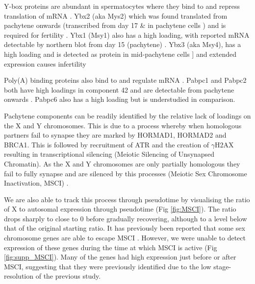 Y-box proteins are abundant in spermatocytes where they bind to and repress translation of mRNA \parencite[Reviwed in]{Kleene2016Positiondependent}. Ybx2 (aka Mys2) which was found translated from pachytene onwards \parencite{Kwon1993Proteins, Oko1996Germ} (transcribed from day 17 \& in pachytene cells \parencite{Gu1998Mammalian}) and is required for fertility \parencite{Yang2005Absence}. Ybx1 (Msy1) also has a high loading, with reported mRNA detectable by northern blot from day 15 (pachytene) \parencite{Tafuri1993mouse}. Ybx3 (aka Msy4), has a high loading and is detected as protein in mid-pachytene cells \parencite{Davies2000SequenceSpecific}] and extended expression causes infertility \parencite{Giorgini2002Translational}

Poly(A) binding proteins also bind to and regulate mRNA \parencite[reviewed in]{OZTURK2018Potential}. Pabpc1 and Pabpc2 both have high loadings in component 42 and are detectable from pachytene onwards \parencite{C.Kleene1994Developmental, Gu1995Poly, Kleene1998Mouse, Lee2000Expression, Kimura2009Characterization}. Pabpc6 also has a high loading but is understudied in comparison.

Pachytene components can be readily identified by the relative lack of loadings on the X and Y chromosomes. This is due to a process whereby when homologous partners fail to synapse they are marked by HORMAD1, HORMAD2 and BRCA1. This is followed by recruitment of ATR and the creation of $\gamma$H2AX resulting in transcriptional silencing (Meiotic Silencing of Unsynapsed Chromatin). As the X and Y chromosomes are only partially homologous they fail to fully synapse and are silenced by this processes (Meiotic Sex Chromosome Inactivation, MSCI) \parencite{Turner2007Meiotic, Turner2015Meiotic}.

We are also able to track this process through pseudotime by visualising the ratio of X to autosomal expression through pseudotime (Fig \ref{fig:MSCI}). The ratio drops sharply to close to 0 before gradually recovering, although to a level below that of the original starting ratio. It has previously been reported that some sex chromosome genes are able to escape MSCI \parencite{daCruz2016Transcriptome, Soumillon2013Cellular}. However, we were unable to detect expression of these genes during the time at which MSCI is active (Fig \ref{fig:supp_MSCI}). Many of the genes had high expression just before or after MSCI, suggesting that they were previously identified due to the low stage-resolution of the previous study. 

